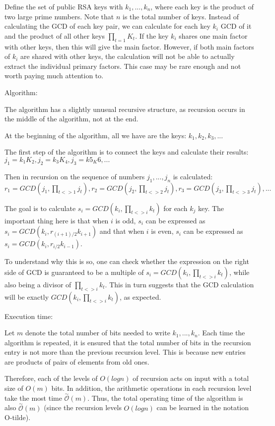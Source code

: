\documentclass[graybox]{svmult}
\begin{document}
Define the set of public RSA keys with $k_1, ... , k_n$, where each key is the product of two large prime numbers. Note that $n$ is the total number of keys. Instead of calculating the GCD of each key pair, we can calculate for each key $k_i$ GCD of it and the product of all other keys $\prod_{t=1} K_t$. If the key $k_i$ shares one main factor with other keys, then this will give the main factor. However, if both main factors of $k_i$ are shared with other keys, the calculation will not be able to actually extract the individual primary factors. This case may be rare enough and not worth paying much attention to. 

Algorithm:

The algorithm has a slightly unusual recursive structure, as recursion occurs in the middle of the algorithm, not at the end.

At the beginning of the algorithm, all we have are the keys: $k_1, k_2, k_3, ...$

The first step of the algorithm is to connect the keys and calculate their results: $j_1=k_1K_2, j_2=k_3K_4, j_3=k5_K6, ...$

Then in recursion on the sequence of numbers $j_1, ..., j_n$ is calculated: $r_1 = GCD(j_1,\prod_{t<>1}j_t), r_2 = GCD(j_2,\prod_{t<>2}j_t), r_3 = GCD(j_3,\prod_{t<>3}j_t), ...$

The goal is to calculate $s_i = GCD (k_i, \prod_{t<>i} k_t)$ for each $k_j$ key. The important thing here is that when $i$ is odd, $s_i$ can be expressed as $s_i = GCD (k_i, r_{(i + 1)/2} k_{i+1})$ and that when $i$ is even, $s_i$ can be expressed as $s_i = GCD (k_i, r_{i/2} k_{i-1})$. 

To understand why this is so, one can check whether the expression on the right side of GCD is guaranteed to be a multiple of $s_i = GCD (k_i, \prod_{t<>i} k_t)$, while also being a divisor of $\prod_{t<>i} k_t$. This in turn suggests that the GCD calculation will be exactly $GCD(k_i, \prod_{t<>i} k_t)$, as expected.

Execution time:

Let $m$ denote the total number of bits needed to write $k_1, ..., k_n$. Each time the algorithm is repeated, it is ensured that the total number of bits in the recursion entry is not more than the previous recursion level. This is because new entries are products of pairs of elements from old ones.

Therefore, each of the levels of $O (log n)$ of recursion acts on input with a total size of $O (m)$ bits. In addition, the arithmetic operations in each recursion level take the most time $\overset{\sim}{\mathcal{O}} (m)$. Thus, the total operating time of the algorithm is also $\overset{\sim}{\mathcal{O}} (m)$ (since the recursion levels $O (log n)$ can be learned in the notation O-tilde).
\end{document}
